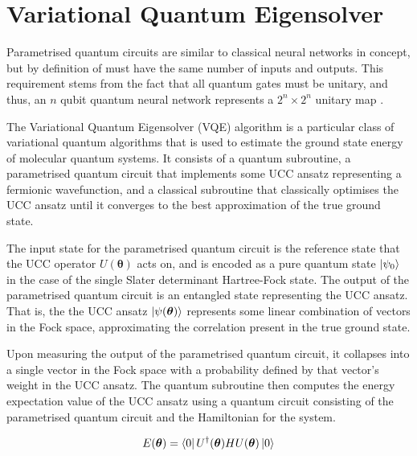 \section{\label{vqe}Variational Quantum Eigensolver}

Parametrised quantum circuits are similar to classical neural networks in concept, but by definition of must have the same number of inputs and outputs. This requirement stems from the fact that all quantum gates must be unitary, and thus, an $n$ qubit quantum neural network represents a $2^n \times 2^n$ unitary map \cite{Yeung2020}.

The Variational Quantum Eigensolver (VQE) algorithm is a particular class of variational quantum algorithms that is used to estimate the ground state energy of molecular quantum systems. It consists of a quantum subroutine, a parametrised quantum circuit that implements some UCC ansatz representing a fermionic wavefunction, and a classical subroutine that classically optimises the UCC ansatz until it converges to the best approximation of the true ground state.

The input state for the parametrised quantum circuit is the reference state that the UCC operator $U(\bm\theta)$ acts on, and is encoded as a pure quantum state $\ket{\psi_0}$ in the case of the single Slater determinant Hartree-Fock state. The output of the parametrised quantum circuit is an entangled state representing the UCC ansatz. That is, the the UCC ansatz $\ket{\psi(\bm\theta)}$ represents some linear combination of vectors in the Fock space, approximating the correlation present in the true ground state.

Upon measuring the output of the parametrised quantum circuit, it collapses into a single vector in the Fock space with a probability defined by that vector's weight in the UCC ansatz. The quantum subroutine then computes the energy expectation value of the UCC ansatz using a quantum circuit consisting of the parametrised quantum circuit and  the Hamiltonian for the system.

\begin{equation*}
    E(\bm\theta) = \bra{0} U^\dagger(\bm\theta) H U(\bm\theta) \ket{0} 
\end{equation*}

